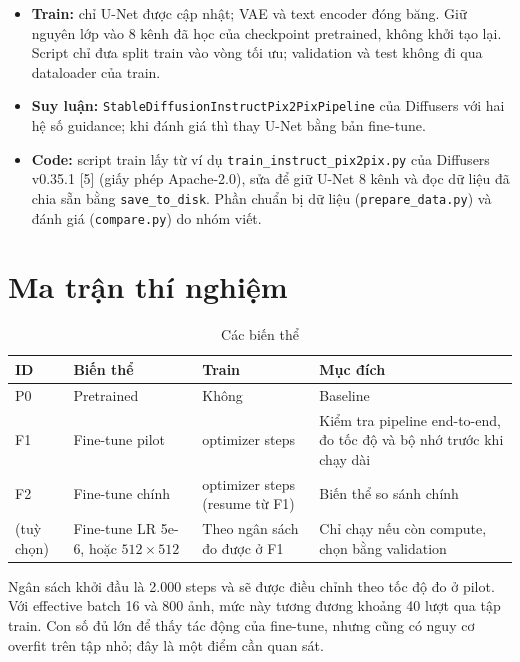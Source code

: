 \documentclass[12pt,a4paper]{article}
\begin{document}
\begin{itemize}
\item \textbf{Train:} chỉ U-Net được cập nhật; VAE và text encoder đóng băng. Giữ
nguyên lớp vào 8 kênh đã học của checkpoint pretrained, không khởi tạo lại. Script
chỉ đưa split train vào vòng tối ưu; validation và test không đi qua dataloader của
train.
\item \textbf{Suy luận:} \texttt{StableDiffusionInstructPix2PixPipeline} của Diffusers
với hai hệ số guidance; khi đánh giá thì thay U-Net bằng bản fine-tune.
\item \textbf{Code:} script train lấy từ ví dụ \texttt{train\_instruct\_pix2pix.py}
của Diffusers v0.35.1 [5] (giấy phép Apache-2.0), sửa để giữ U-Net 8 kênh và đọc dữ
liệu đã chia sẵn bằng \texttt{save\_to\_disk}. Phần chuẩn bị dữ liệu
(\texttt{prepare\_data.py}) và đánh giá (\texttt{compare.py}) do nhóm viết.
\end{itemize}

\section{Ma trận thí nghiệm}
\label{sec:matrix}

\begin{table}[H]
\centering
\caption{Các biến thể}
\small
\begin{tabular}{l>{\raggedright\arraybackslash}p{3.4cm}>{\raggedright\arraybackslash}p{3.6cm}>{\raggedright\arraybackslash}p{5.6cm}}
\toprule
ID & Biến thể & Train & Mục đích \\
\midrule
P0 & Pretrained & Không & Baseline \\
F1 & Fine-tune pilot & 100 optimizer steps & Kiểm tra pipeline end-to-end, đo tốc độ
và bộ nhớ trước khi chạy dài \\
F2 & Fine-tune chính & 2.000 optimizer steps (resume từ F1) & Biến thể so sánh chính \\
(tuỳ chọn) & Fine-tune LR 5e-6, hoặc $512\times512$ & Theo ngân sách đo được ở F1 &
Chỉ chạy nếu còn compute, chọn bằng validation \\
\bottomrule
\end{tabular}
\end{table}

Ngân sách khởi đầu là 2.000 steps và sẽ được điều chỉnh theo tốc độ đo ở pilot. Với
effective batch 16 và 800 ảnh, mức này tương đương khoảng 40 lượt qua tập train. Con
số đủ lớn để thấy tác động của fine-tune, nhưng cũng có nguy cơ overfit trên tập nhỏ;
đây là một điểm cần quan sát.
\end{document}
